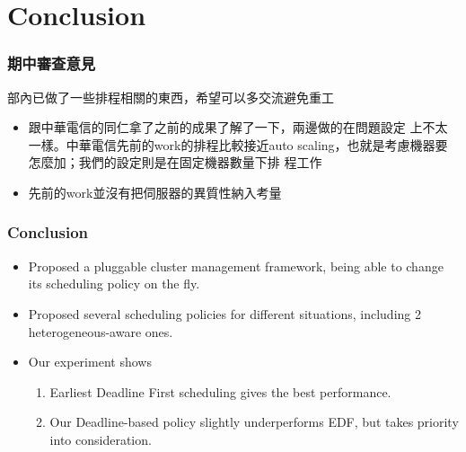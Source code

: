 \documentclass{beamer}
\begin{document}
\section{Conclusion}

\begin{frame}
  \frametitle{期中審查意見}
  部內已做了一些排程相關的東西，希望可以多交流避免重工
  \begin{itemize}

    \item 跟中華電信的同仁拿了之前的成果了解了一下，兩邊做的在問題設定
      上不太一樣。中華電信先前的work的排程比較接近auto
      scaling，也就是考慮機器要怎麼加；我們的設定則是在固定機器數量下排
      程工作
    \item 先前的work並沒有把伺服器的異質性納入考量
  \end{itemize}
\end{frame}
\begin{frame}
  \frametitle{Conclusion}
  \begin{itemize}
    \item Proposed a pluggable cluster management framework, being able
      to change its scheduling policy on the fly.
    \item Proposed several scheduling policies for different situations,
      including 2 heterogeneous-aware ones.
    \item Our experiment shows 
      \begin{enumerate}
        \item Earliest Deadline First scheduling gives the best performance.
        \item Our Deadline-based policy slightly underperforms EDF,
          but takes priority into consideration.
      \end{enumerate}
  \end{itemize}
\end{frame}
\end{document}
